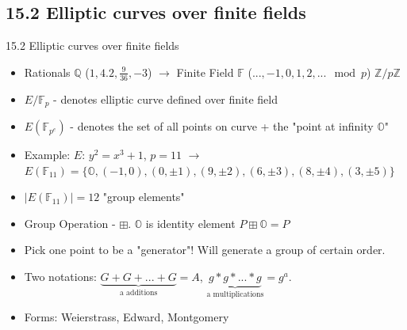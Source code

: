 \documentclass[aspectratio=169,xcolor=dvipsnames]{beamer}
\begin{document}
\subsection{15.2 Elliptic curves over finite fields}
    \begin{frame}{15.2 Elliptic curves over finite fields}
        \begin{itemize}
            \item Rationals $\mathbb{Q}$ ($1, 4.2, \frac{9}{36}, -3$) $\rightarrow$ Finite Field $\mathbb{F}$ ($..., -1, 0, 1, 2, ... \mod{p}$) $\mathbb{Z}/p\mathbb{Z}$
            \item $E/\mathbb{F}_p$ - denotes elliptic curve defined over finite field 
            \item $E(\mathbb{F}_{p^e})$ - denotes the set of all points on curve + the "point at infinity $\mathbb{O}$"
            \item Example: $E$: $y^2 = x^3 + 1$, $p = 11$ $\rightarrow$ $E(\mathbb{F}_{11}) = \{ \mathbb{O}, (-1, 0), (0, \pm 1), (9, \pm 2), (6, \pm 3), (8, \pm 4), (3, \pm 5)  \}$
            \item $|E(\mathbb{F}_{11})| = 12$ "group elements"
            \item Group Operation - $\boxplus$. $\mathbb{O}$ is identity element $P \boxplus \mathbb{O} = P$
            \item Pick one point to be a "generator"! Will generate a group of certain order.
            \item Two notations: $\underbrace{G + G + ... + G}_\text{a additions} = A$, $\underbrace{g*g*...* g}_\text{a multiplications} = g^a$.
            \item Forms: Weierstrass, Edward, Montgomery 
        \end{itemize}
\end{frame}
\end{document}
